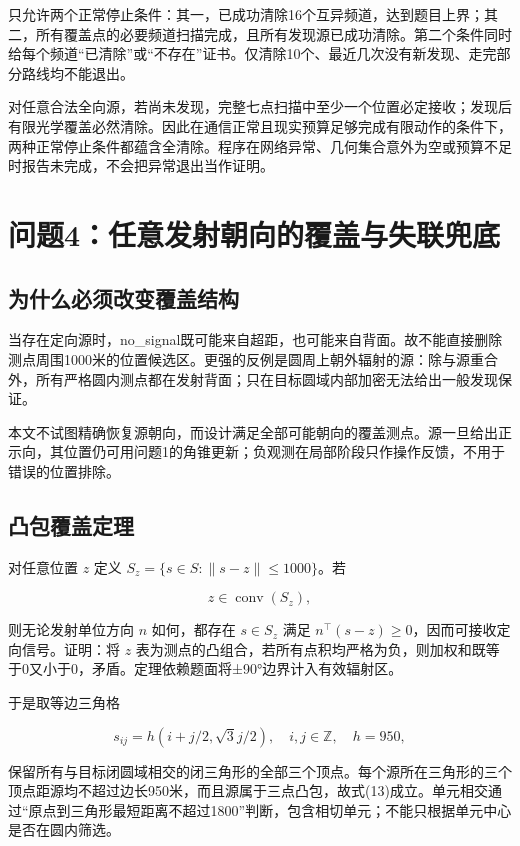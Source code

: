 \documentclass[
  chinese,
  UTF8,
  a4paper,
  zihao=-4]{ctexart}
\begin{document}
只允许两个正常停止条件：其一，已成功清除16个互异频道，达到题目上界；其二，所有覆盖点的必要频道扫描完成，且所有发现源已成功清除。第二个条件同时给每个频道``已清除''或``不存在''证书。仅清除10个、最近几次没有新发现、走完部分路线均不能退出。

对任意合法全向源，若尚未发现，完整七点扫描中至少一个位置必定接收；发现后有限光学覆盖必然清除。因此在通信正常且现实预算足够完成有限动作的条件下，两种正常停止条件都蕴含全清除。程序在网络异常、几何集合意外为空或预算不足时报告未完成，不会把异常退出当作证明。

\section{问题4：任意发射朝向的覆盖与失联兜底}\label{ux95eeux98984ux4efbux610fux53d1ux5c04ux671dux5411ux7684ux8986ux76d6ux4e0eux5931ux8054ux515cux5e95}

\subsection{为什么必须改变覆盖结构}\label{ux4e3aux4ec0ux4e48ux5fc5ux987bux6539ux53d8ux8986ux76d6ux7ed3ux6784}

当存在定向源时，no\_signal既可能来自超距，也可能来自背面。故不能直接删除测点周围1000米的位置候选区。更强的反例是圆周上朝外辐射的源：除与源重合外，所有严格圆内测点都在发射背面；只在目标圆域内部加密无法给出一般发现保证。

本文不试图精确恢复源朝向，而设计满足全部可能朝向的覆盖测点。源一旦给出正示向，其位置仍可用问题1的角锥更新；负观测在局部阶段只作操作反馈，不用于错误的位置排除。

\subsection{凸包覆盖定理}\label{ux51f8ux5305ux8986ux76d6ux5b9aux7406}

对任意位置 \(z\) 定义 \(S_z=\{s\in S:\|s-z\|\le1000\}\)。若

\[z\in\operatorname{conv}(S_z), \tag{13}\]

则无论发射单位方向 \(n\) 如何，都存在 \(s\in S_z\) 满足
\(n^\top(s-z)\ge0\)，因而可接收定向信号。证明：将 \(z\)
表为测点的凸组合，若所有点积均严格为负，则加权和既等于0又小于0，矛盾。定理依赖题面将±90°边界计入有效辐射区。

于是取等边三角格

\[s_{ij}=h(i+j/2,\sqrt3j/2),\quad i,j\in\mathbb Z,\quad h=950,\]

保留所有与目标闭圆域相交的闭三角形的全部三个顶点。每个源所在三角形的三个顶点距源均不超过边长950米，而且源属于三点凸包，故式(13)成立。单元相交通过``原点到三角形最短距离不超过1800''判断，包含相切单元；不能只根据单元中心是否在圆内筛选。
\end{document}
